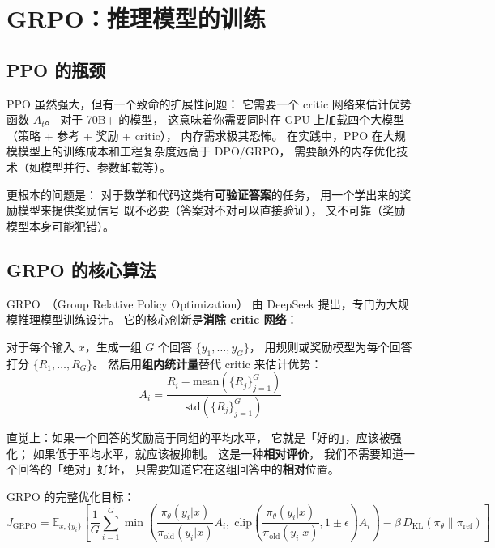 \section{GRPO：推理模型的训练}

\subsection{PPO 的瓶颈}

PPO 虽然强大，但有一个致命的扩展性问题：
它需要一个 critic 网络来估计优势函数 $A_t$。
对于 70B+ 的模型，
这意味着你需要同时在 GPU 上加载四个大模型
（策略 + 参考 + 奖励 + critic），
内存需求极其恐怖。
在实践中，PPO 在大规模模型上的训练成本和工程复杂度远高于 DPO/GRPO，
需要额外的内存优化技术（如模型并行、参数卸载等）。

更根本的问题是：
对于数学和代码这类有\textbf{可验证答案}的任务，
用一个学出来的奖励模型来提供奖励信号
既不必要（答案对不对可以直接验证），
又不可靠（奖励模型本身可能犯错）。

\subsection{GRPO 的核心算法}

GRPO~\cite{shao2024grpo}（Group Relative Policy Optimization）
由 DeepSeek 提出，专门为大规模推理模型训练设计。
它的核心创新是\textbf{消除 critic 网络}：

对于每个输入 $x$，生成一组 $G$ 个回答
$\{y_1, \ldots, y_G\}$，
用规则或奖励模型为每个回答打分 $\{R_1, \ldots, R_G\}$。
然后用\textbf{组内统计量}替代 critic 来估计优势：
\begin{equation}
  A_i = \frac{R_i - \mathrm{mean}(\{R_j\}_{j=1}^G)}
             {\mathrm{std}(\{R_j\}_{j=1}^G)}
  \label{eq:grpo-adv}
\end{equation}

直觉上：如果一个回答的奖励高于同组的平均水平，
它就是「好的」，应该被强化；
如果低于平均水平，就应该被抑制。
这是一种\textbf{相对评价}，
我们不需要知道一个回答的「绝对」好坏，
只需要知道它在这组回答中的\textbf{相对}位置。

GRPO 的完整优化目标：
\begin{equation}
  J_{\text{GRPO}} = \mathbb{E}_{x, \{y_i\}} \left[
    \frac{1}{G} \sum_{i=1}^{G}
    \min\!\left(
      \frac{\pi_\theta(y_i|x)}{\pi_{\text{old}}(y_i|x)} A_i,\;
      \mathrm{clip}\!\left(
        \frac{\pi_\theta(y_i|x)}{\pi_{\text{old}}(y_i|x)},
        1 \pm \epsilon
      \right) A_i
    \right)
    - \beta \, D_{\text{KL}}(\pi_\theta \| \pi_{\text{ref}})
  \right]
  \label{eq:grpo-objective}
\end{equation}

